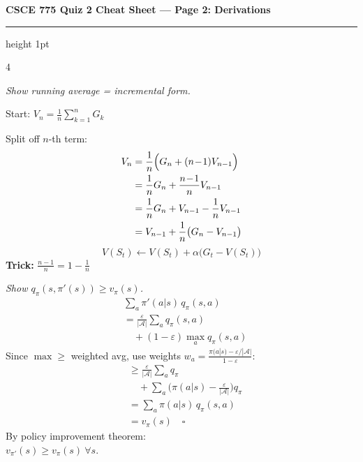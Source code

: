 \documentclass[6pt]{article}
\newcommand{\mathbox}[2]{%
\begin{tcolorbox}[colback=sandstorm, colframe=garnet, title={\scriptsize\bfseries\color{white}#1}, coltitle=white, colbacktitle=garnet, toptitle=1pt, bottomtitle=1pt]
#2
\end{tcolorbox}
}
\begin{document}
\newpage

\begin{center}
{\large\bfseries\color{garnet} CSCE 775 Quiz 2 Cheat Sheet --- Page 2: Derivations}
\end{center}
\vspace{-4pt}
\hrule height 1pt
\vspace{2pt}

\begin{multicols}{4}

\mathbox{1. MC Incremental Update}{
\textit{Show running average = incremental form.}

Start: $V_n = \frac{1}{n}\sum_{k=1}^n G_k$

Split off $n$-th term:
\begin{align*}
V_n &= \frac{1}{n}\Bigl(G_n + (n\!-\!1)V_{n-1}\Bigr)\\
&= \frac{1}{n}G_n + \frac{n\!-\!1}{n}V_{n-1}\\
&= \frac{1}{n}G_n + V_{n-1} - \frac{1}{n}V_{n-1}\\
&= V_{n-1} + \frac{1}{n}\bigl(G_n - V_{n-1}\bigr)
\end{align*}
\[\boxed{V(S_t) \leftarrow V(S_t) + \alpha\bigl(G_t - V(S_t)\bigr)}\]
\textbf{Trick:} $\frac{n-1}{n} = 1 - \frac{1}{n}$
}

\vspace{3pt}

\mathbox{2. $\varepsilon$-Greedy Improvement}{
\textit{Show $q_\pi(s,\pi'(s)) \geq v_\pi(s)$.}
\begin{align*}
&\sum_a \pi'(a|s)\,q_\pi(s,a) \\
&= \frac{\varepsilon}{|\mathcal{A}|}\sum_a q_\pi(s,a)\\
&\quad + (1\!-\!\varepsilon)\max_a q_\pi(s,a)
\end{align*}
Since $\max \geq$ weighted avg, use weights
$w_a = \frac{\pi(a|s) - \varepsilon/|\mathcal{A}|}{1-\varepsilon}$:
\begin{align*}
&\geq \frac{\varepsilon}{|\mathcal{A}|}\sum_a q_\pi\\
&\quad + \sum_a\bigl(\pi(a|s) - \tfrac{\varepsilon}{|\mathcal{A}|}\bigr)q_\pi\\
&= \sum_a \pi(a|s)\,q_\pi(s,a)\\
&= v_\pi(s) \quad\square
\end{align*}
By policy improvement theorem:\\
$v_{\pi'}(s) \geq v_\pi(s)\ \forall s$.
}


\end{multicols}
\end{document}
